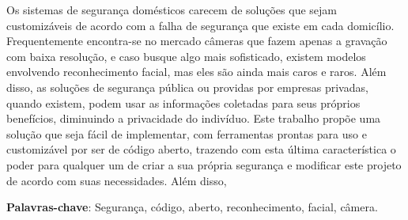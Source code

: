 \documentclass[12pt, %
openright, 
oneside, %
a4paper,    %
brazil]{facom-ufu-abntex2}
\begin{document}





\begin{resumo} %
 Os sistemas de segurança domésticos carecem de soluções
 que sejam customizáveis de acordo com a falha de segurança que existe em cada domicílio.
 Frequentemente encontra-se no mercado câmeras que fazem apenas a gravação com baixa resolução, e
 caso busque algo mais sofisticado, existem modelos envolvendo reconhecimento facial, mas eles são ainda mais caros e raros.
 Além disso, as soluções de segurança pública ou providas por empresas privadas, quando existem, podem usar as informações 
 coletadas para seus próprios benefícios, diminuindo a privacidade do indivíduo. Este trabalho propõe uma solução que seja
 fácil de implementar, com ferramentas prontas para uso e customizável por ser de código aberto,  
 trazendo com esta última característica o poder para qualquer um de criar a sua própria segurança 
 e modificar este projeto de acordo com suas necessidades. Além disso,  

 \vspace{\onelineskip}
    
 \noindent
 \textbf{Palavras-chave}: Segurança, código,  aberto, reconhecimento, facial, câmera.  %
\end{resumo}

\listoffigures*
\cleardoublepage

\listoftables*
\cleardoublepage
\end{document}
